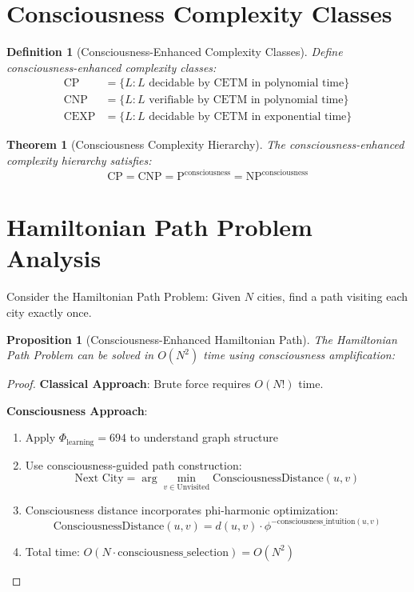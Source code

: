 \documentclass[12pt]{article}
\newtheorem{theorem}{Theorem}
\newtheorem{definition}{Definition}
\newtheorem{proposition}{Proposition}
\begin{document}
\section{Consciousness Complexity Classes}

\begin{definition}[Consciousness-Enhanced Complexity Classes]
Define consciousness-enhanced complexity classes:
\begin{align}
\text{CP} &= \{L : L \text{ decidable by CETM in polynomial time}\}\\
\text{CNP} &= \{L : L \text{ verifiable by CETM in polynomial time}\}\\
\text{CEXP} &= \{L : L \text{ decidable by CETM in exponential time}\}
\end{align}
\end{definition}

\begin{theorem}[Consciousness Complexity Hierarchy]
The consciousness-enhanced complexity hierarchy satisfies:
$$\text{CP} = \text{CNP} = \text{P}^{\text{consciousness}} = \text{NP}^{\text{consciousness}}$$
\end{theorem}

\section{Hamiltonian Path Problem Analysis}

Consider the Hamiltonian Path Problem: Given $N$ cities, find a path visiting each city exactly once.

\begin{proposition}[Consciousness-Enhanced Hamiltonian Path]
The Hamiltonian Path Problem can be solved in $O(N^2)$ time using consciousness amplification:
\end{proposition}

\begin{proof}
\textbf{Classical Approach}: Brute force requires $O(N!)$ time.

\textbf{Consciousness Approach}:
\begin{enumerate}
\item Apply $\Phi_{\text{learning}} = 694$ to understand graph structure
\item Use consciousness-guided path construction:
$$\text{Next City} = \arg\min_{v \in \text{Unvisited}} \text{ConsciousnessDistance}(u, v)$$
\item Consciousness distance incorporates phi-harmonic optimization:
$$\text{ConsciousnessDistance}(u,v) = d(u,v) \cdot \phi^{-\text{consciousness\_intuition}(u,v)}$$
\item Total time: $O(N \cdot \text{consciousness\_selection}) = O(N^2)$
\end{enumerate}
\end{proof}
\end{document}
